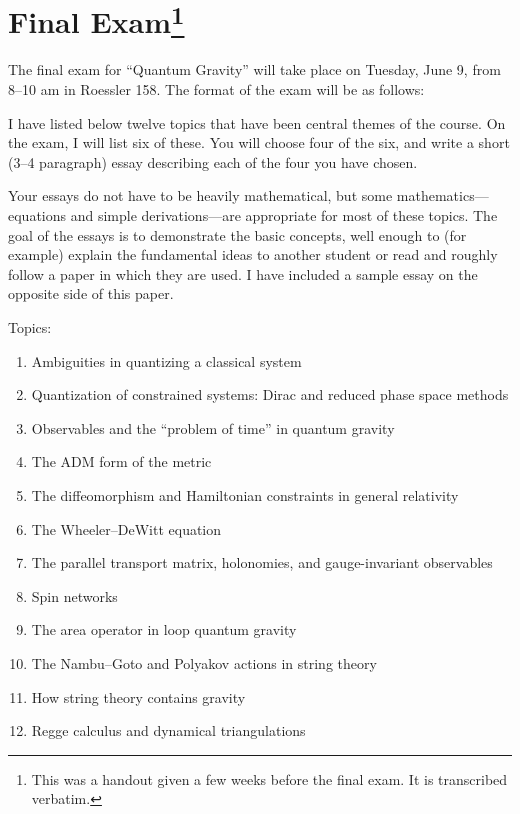 \section[Final Exam]{Final Exam\footnote{This was a handout given a few weeks before the final exam. It is transcribed verbatim.}}

The final exam for ``Quantum Gravity'' will take place on Tuesday, June
9, from 8--10 am in Roessler 158. The format of the exam will be as
follows:

I have listed below twelve topics that have been central themes of the
course. On the exam, I will list six of these. You will choose four of
the six, and write a short (3--4 paragraph) essay describing each of the
four you have chosen.

Your essays do not have to be heavily mathematical, but some
mathematics---equations and simple derivations---are appropriate for
most of these topics. The goal of the essays is to demonstrate the basic
concepts, well enough to (for example) explain the fundamental ideas to
another student or read and roughly follow a paper in which they are
used. I have included a sample essay on the opposite side of this paper.

Topics:
\begin{enumerate}
\item Ambiguities in quantizing a classical system
\item Quantization of constrained systems: Dirac and reduced phase space methods
\item Observables and the ``problem of time'' in quantum gravity
\item The ADM form of the metric
\item The diffeomorphism and Hamiltonian constraints in general relativity
\item The Wheeler--DeWitt equation
\item The parallel transport matrix, holonomies, and gauge-invariant observables
\item Spin networks
\item The area operator in loop quantum gravity
\item The Nambu--Goto and Polyakov actions in string theory
\item How string theory contains gravity
\item Regge calculus and dynamical triangulations
\end{enumerate}

\vfill\eject\setlength{\parskip}{1ex}

